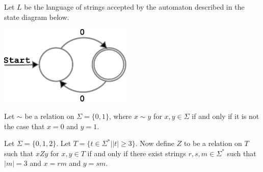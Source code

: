 \documentclass[addpoints]{exam}
\theoremstyle{definition}
\begin{document}
\begin{questions}
\clearpage
\question Let $L$ be the language of strings accepted by the automaton
described in the state diagram below.

\begin{center}
\includegraphics[width=2.5in, height=.75in,keepaspectratio=true]{oddzeroautomaton.pdf}
\end{center}     

\question Let $\sim$ be a relation on $\Sigma = \{0,1\}$, where $x\sim y$ for $x,y \in
\Sigma$ if and only if it is not the case that $x = 0$ and $y = 1$. 

\question
Let $\Sigma = \{0,1,2\}$.  Let $T = \{t \in \Sigma^* | |t| \geq 3\}$.
Now define $Z$ to be a relation on $T$ such that $xZy$ for $x,y \in T$ if and only if 
there exist strings $r,s,m \in \Sigma^*$ such that $|m| = 3$ and $x = rm$ and $y = sm$. 


\end{questions}
\end{document}
